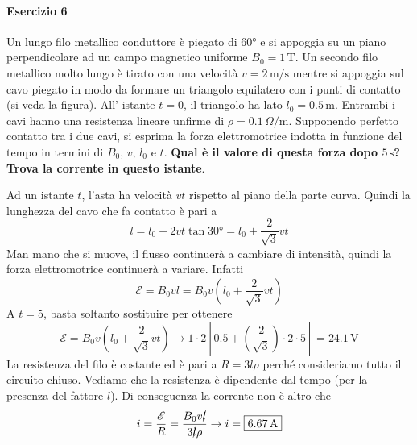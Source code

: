\paragraph{Esercizio 6}
Un lungo filo metallico conduttore è piegato di $\ang{60}$ e si appoggia su un piano 
perpendicolare ad un campo magnetico uniforme $B_0 = 1\,\text{T}$. Un secondo filo metallico
molto lungo è tirato con una velocità $v=2\,\text{m/s}$ mentre si appoggia sul cavo piegato
in modo da formare un triangolo equilatero con i punti di contatto (si veda la figura). All'
istante $t=0$, il triangolo ha lato $l_0 = 0.5\,\text{m}$. Entrambi i cavi hanno una resistenza 
lineare unfirme di $\rho = 0.1\,\Omega\text{/m}$. Supponendo perfetto contatto tra i due cavi, si
esprima la forza elettromotrice indotta in funzione del tempo in termini di $B_0$, $v$, $l_0$ e 
$t$. \textbf{Qual è il valore di questa forza dopo $5\,\text{s}$? Trova la corrente in questo 
istante}.
\begin{center}
\end{center}

\divisor

Ad un istante $t$, l'asta ha velocità $vt$ rispetto al piano della parte curva. Quindi la 
lunghezza del cavo che fa contatto è pari a
\begin{equation*}
  l = l_0 + 2vt\tan\ang{30} = l_0+\frac{2}{\sqrt{3}}vt
\end{equation*}
Man mano che si muove, il flusso continuerà a cambiare di intensità, quindi la forza 
elettromotrice continuerà a variare. Infatti
\begin{equation*}
  \mathcal{E} = B_0vl = B_0v \left( l_0+\frac{2}{\sqrt{3}}vt \right)
\end{equation*}
A $t=5$, basta soltanto sostituire per ottenere
\begin{equation*}
  \mathcal{E} = B_0v \left( l_0+\frac{2}{\sqrt{3}}vt \right) \rightarrow 1\cdot2 
  \left[ 0.5+\left( \frac{2}{\sqrt{3}} \right)\cdot 2\cdot5 \right] = \boxed{24.1\,\text{V}}
\end{equation*}
La resistenza del filo è costante ed è pari a $R = 3l\rho$ perché consideriamo tutto il circuito
chiuso. Vediamo che la resistenza è dipendente dal tempo (per la presenza del fattore $l$).
Di conseguenza la corrente non è altro che
\begin{equation*}
  i = \frac{\mathcal{E}}{R} = \frac{B_0v\cancel{l}}{3\cancel{l}\rho} \rightarrow 
  i = \boxed{6.67\,\text{A}}
\end{equation*}
